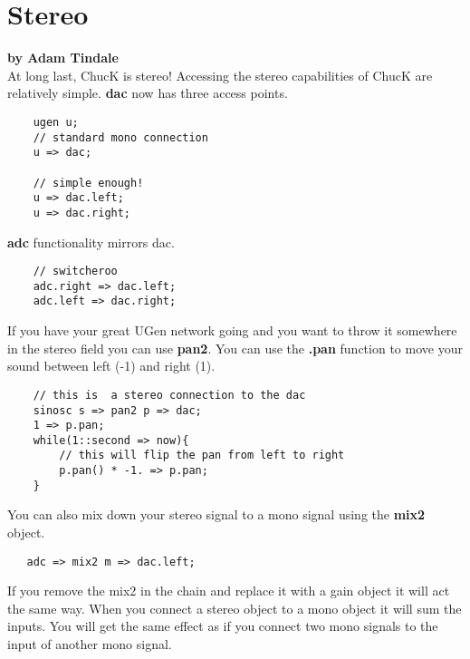 \section{Stereo}
\textbf{by Adam Tindale}\\

At long last, ChucK is stereo! Accessing the stereo capabilities of ChucK are relatively simple. {\bf dac} now has three access points. 

\begin{verbatim}
    ugen u;
    // standard mono connection
    u => dac;

    // simple enough!
    u => dac.left;
    u => dac.right;
\end{verbatim}

{\bf adc} functionality mirrors dac. 

\begin{verbatim}
    // switcheroo
    adc.right => dac.left;
    adc.left => dac.right;
\end{verbatim}

If you have your great UGen network going and you want to throw it somewhere in the stereo field you can use {\bf pan2}. You can use the {\bf .pan} function to move your sound between left (-1) and right (1).

\begin{verbatim}
    // this is  a stereo connection to the dac
    sinosc s => pan2 p => dac;
    1 => p.pan;
    while(1::second => now){
        // this will flip the pan from left to right
        p.pan() * -1. => p.pan;
    }
\end{verbatim}


You can also mix down your stereo signal to a mono signal using the {\bf mix2} object. 

\begin{verbatim}
   adc => mix2 m => dac.left;
\end{verbatim}

If you remove the mix2 in the chain and replace it with a gain object it will act the same way. When you connect a stereo object to a mono object it will sum the inputs. You will get the same effect as if you connect two mono signals to the input of another mono signal. 